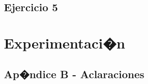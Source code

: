 \documentclass[10pt, a4paper, hidelinks]{article}
\begin{document}
\subsection{Ejercicio 5}

\section{Experimentaci�n}


\newpage



\subsection{Ap�ndice B - Aclaraciones}
\end{document}
